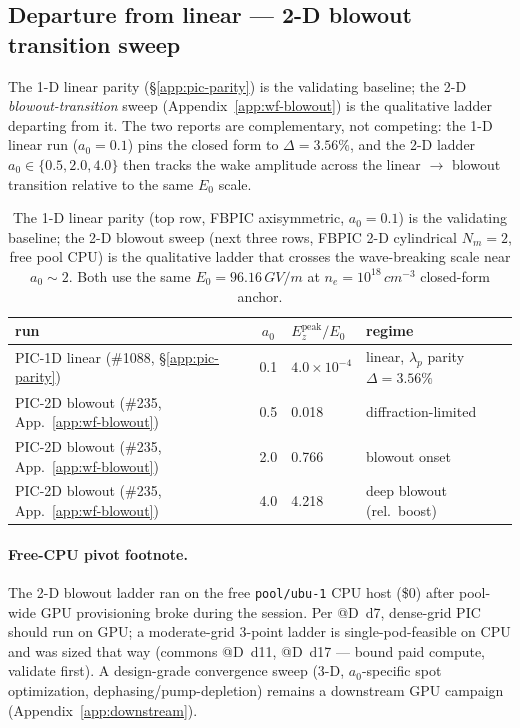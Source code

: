\subsection{Departure from linear --- 2-D blowout transition sweep}
\label{app:pic-blowout-departure}

The 1-D linear parity (\S\ref{app:pic-parity}) is the validating
baseline; the 2-D \emph{blowout-transition} sweep
(Appendix~\ref{app:wf-blowout}) is the qualitative ladder departing from
it. The two reports are complementary, not competing: the 1-D linear run
($a_0\!=\!0.1$) pins the closed form to $\Delta\!=\!3.56\%$, and the 2-D
ladder $a_0\in\{0.5, 2.0, 4.0\}$ then tracks the wake amplitude across
the linear $\to$ blowout transition relative to the same $E_0$ scale.

\begin{table}[h]
\centering
\small
\setlength{\tabcolsep}{6pt}
\begin{tabular}{@{}l c l l@{}}
\toprule
run & $a_0$ & $E_z^{\text{peak}}/E_0$ & regime \\
\midrule
PIC-1D linear (\#1088, \S\ref{app:pic-parity})        & 0.1 & $4.0\times 10^{-4}$ & linear, $\lambda_p$ parity $\Delta\!=\!3.56\%$ \\
PIC-2D blowout (\#235, App.~\ref{app:wf-blowout})     & 0.5 & 0.018               & diffraction-limited \\
PIC-2D blowout (\#235, App.~\ref{app:wf-blowout})     & 2.0 & 0.766               & blowout onset \\
PIC-2D blowout (\#235, App.~\ref{app:wf-blowout})     & 4.0 & 4.218               & deep blowout (rel.\ boost) \\
\bottomrule
\end{tabular}
\caption{The 1-D linear parity (top row, FBPIC axisymmetric, $a_0\!=\!0.1$)
is the validating baseline; the 2-D blowout sweep (next three rows,
FBPIC 2-D cylindrical $N_m\!=\!2$, free pool CPU) is the qualitative
ladder that crosses the wave-breaking scale near $a_0\!\sim\!2$. Both use
the same $E_0\!=\!96.16\,\si{GV/m}$ at $n_e\!=\!10^{18}\,\si{cm^{-3}}$
closed-form anchor.}
\label{tab:app-pic-blowout-departure}
\end{table}

\paragraph{Free-CPU pivot footnote.} The 2-D blowout ladder ran on the
free \texttt{pool/ubu-1} CPU host (\$0) after pool-wide GPU provisioning
broke during the session. Per @D~d7, dense-grid PIC should run on GPU; a
moderate-grid 3-point ladder is single-pod-feasible on CPU and was sized
that way (commons @D~d11, @D~d17 --- bound paid compute, validate first).
A design-grade convergence sweep (3-D, $a_0$-specific spot optimization,
dephasing/pump-depletion) remains a downstream GPU campaign
(Appendix~\ref{app:downstream}).
